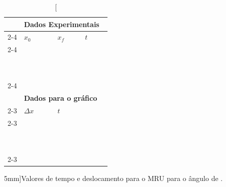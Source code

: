 \begin{table}[!ht]
\centering
\begin{tabular}{lp{25mm}p{25mm}p{25mm}l}
\toprule
	&\multicolumn{4}{l}{\textbf{Dados Experimentais}} \\
	\cmidrule{2-4}
	& $x_0$ & $x_f$ & $t$ & \\
	\cmidrule{2-4}
	& \cellcolor[gray]{0.89} & \cellcolor[gray]{0.92} & \cellcolor[gray]{0.89} \\
	& \cellcolor[gray]{0.95} & \cellcolor[gray]{0.97} & \cellcolor[gray]{0.95} \\
	& \cellcolor[gray]{0.89} & \cellcolor[gray]{0.92} & \cellcolor[gray]{0.89} \\
	& \cellcolor[gray]{0.95} & \cellcolor[gray]{0.97} & \cellcolor[gray]{0.95} \\
	& \cellcolor[gray]{0.89} & \cellcolor[gray]{0.92} & \cellcolor[gray]{0.89} \\
	& \cellcolor[gray]{0.95} & \cellcolor[gray]{0.97} & \cellcolor[gray]{0.95} \\
	& \cellcolor[gray]{0.89} & \cellcolor[gray]{0.92} & \cellcolor[gray]{0.89} \\
	& \cellcolor[gray]{0.95} & \cellcolor[gray]{0.97} & \cellcolor[gray]{0.95} \\
	& \cellcolor[gray]{0.89} & \cellcolor[gray]{0.92} & \cellcolor[gray]{0.89} \\
	& \cellcolor[gray]{0.95} & \cellcolor[gray]{0.97} & \cellcolor[gray]{0.95} \\
	\cmidrule{2-4}
\\
	& \multicolumn{3}{l}{\textbf{Dados para o gráfico}} \\
	\cmidrule{2-3}
	& $\Delta x$ & $t$ \\
	\cmidrule{2-3}
	& \cellcolor[gray]{0.89} & \cellcolor[gray]{0.92} \\ 
	& \cellcolor[gray]{0.95} & \cellcolor[gray]{0.97} \\ 
	& \cellcolor[gray]{0.89} & \cellcolor[gray]{0.92} \\ 
	& \cellcolor[gray]{0.95} & \cellcolor[gray]{0.97} \\ 
	& \cellcolor[gray]{0.89} & \cellcolor[gray]{0.92} \\ 
	& \cellcolor[gray]{0.95} & \cellcolor[gray]{0.97} \\ 
	& \cellcolor[gray]{0.89} & \cellcolor[gray]{0.92} \\ 
	& \cellcolor[gray]{0.95} & \cellcolor[gray]{0.97} \\ 
	& \cellcolor[gray]{0.89} & \cellcolor[gray]{0.92} \\ 
	& \cellcolor[gray]{0.95} & \cellcolor[gray]{0.97} \\ 
	\cmidrule{2-3}
\bottomrule
\end{tabular}
\caption[][5mm]{Valores de tempo e deslocamento para o MRU para o ângulo de .}
\label{DadosMRU2}
\end{table}

